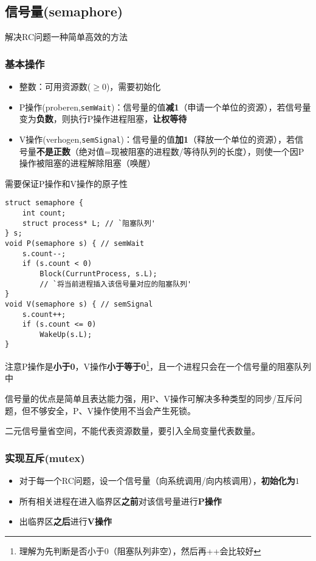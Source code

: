 \subsection{信号量(semaphore)}
解决RC问题一种简单高效的方法

\subsubsection{基本操作}
\begin{itemize}
    \item 整数：可用资源数($\geq 0$)，需要初始化
    \item P操作(proberen,\verb'semWait')：信号量的值\textbf{减1}（申请一个单位的资源），若信号量变为\textbf{负数}，则执行P操作进程阻塞，\textbf{让权等待}
    \item V操作(verhogen,\verb'semSignal')：信号量的值\textbf{加1}（释放一个单位的资源），若信号量\textbf{不是正数}（绝对值=现被阻塞的进程数/等待队列的长度），则使一个因P操作被阻塞的进程解除阻塞（唤醒）
\end{itemize}
需要保证P操作和V操作的原子性
\begin{lstlisting}
struct semaphore {
    int count;
    struct process* L; // `阻塞队列'
} s;
void P(semaphore s) { // semWait
    s.count--;
    if (s.count < 0)
        Block(CurruntProcess, s.L);
        // `将当前进程插入该信号量对应的阻塞队列'
}
void V(semaphore s) { // semSignal
    s.count++;
    if (s.count <= 0)
        WakeUp(s.L);
}
\end{lstlisting}
注意P操作是\textbf{小于0}，V操作\textbf{小于等于0}\footnote{理解为先判断是否小于0（阻塞队列非空），然后再++会比较好}，且一个进程只会在一个信号量的阻塞队列中

信号量的优点是简单且表达能力强，用P、V操作可解决多种类型的同步/互斥问题，但不够安全，P、V操作使用不当会产生死锁。

二元信号量省空间，不能代表资源数量，要引入全局变量代表数量。

\subsubsection{实现互斥(mutex)}
\begin{itemize}
    \item 对于每一个RC问题，设一个信号量（向系统调用/向内核调用），\textbf{初始化为$1$}
    \item 所有相关进程在进入临界区\textbf{之前}对该信号量进行\textbf{P操作}
    \item 出临界区\textbf{之后}进行\textbf{V操作}
\end{itemize}

